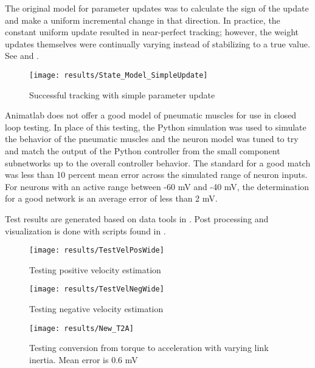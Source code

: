 
The original model for parameter updates was to calculate the sign of the update
and make a uniform incremental change in that direction. In practice, the constant uniform update
resulted in near-perfect tracking; however, the weight updates themselves were continually varying instead of stabilizing to a true value. See  and .

\begin{figure}
\centering
\texttt{[image: results/State\_Model\_SimpleUpdate]}
\caption{Successful tracking with simple parameter update}
\label{fig:StateUpdateSimple}
\end{figure}


Animatlab does not offer a good model of pneumatic muscles for use in closed loop testing. In place of this testing, the Python simulation was used to simulate the behavior of the pneumatic muscles and the neuron model was tuned to try and match the output of the Python controller from the small component subnetworks up to the overall controller behavior. The standard for a good match was less than 10 percent mean error across the simulated range of neuron inputs. For neurons with an active range between -60 mV and -40 mV, the determination for a good network is an average error of less than 2 mV.


Test results are generated based on data tools in . Post processing and visualization is done with scripts found in .

\begin{figure}
\centering
\texttt{[image: results/TestVelPosWide]}
\caption{Testing positive velocity estimation}
\label{fig:TestVelPos}
\end{figure}

\begin{figure}
\centering
\texttt{[image: results/TestVelNegWide]}
\caption{Testing negative velocity estimation}
\label{fig:TestVelNeg}
\end{figure}

\begin{figure}
\centering
\texttt{[image: results/New\_T2A]}
\caption{Testing conversion from torque to acceleration with varying link inertia. Mean error is 0.6 mV}
\label{fig:TestAccelInertia}
\end{figure}

